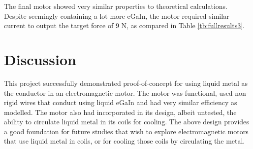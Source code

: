 \documentclass[a4paper,12pt]{article}
\begin{document}
The final motor showed very similar properties to theoretical calculations. Despite seemingly containing a lot more eGaIn, the motor required similar current to output the target force of 9 N, as compared in Table \ref{tb:fullresults3}.

\newpage

\section{Discussion}
This project successfully demonstrated proof-of-concept for using liquid metal as the conductor in an electromagnetic motor. The motor was functional, used non-rigid wires that conduct using liquid eGaIn and had very similar efficiency as modelled. The motor also had incorporated in its design, albeit untested, the ability to circulate liquid metal in its coils for cooling. The above design provides a good foundation for future studies that wish to explore electromagnetic motors that use liquid metal in coils, or for cooling those coils by circulating the metal.
\end{document}
